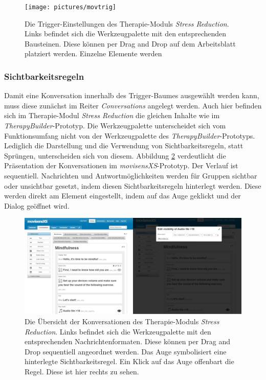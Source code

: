 \begin{figure}[h]
\centering
\texttt{[image: pictures/movtrig]}
\caption{Die Trigger-Einstellungen des Therapie-Moduls \emph{Stress Reduction}. Links befindet sich die Werkzeugpalette mit den entsprechenden Bausteinen. Diese können per Drag and Drop auf dem Arbeitsblatt platziert werden. Einzelne Elemente werden}
\label{start}
\end{figure}



\subsubsection{Sichtbarkeitsregeln}
Damit eine Konversation innerhalb des Trigger-Baumes ausgewählt werden kann, muss diese zunächst im Reiter \emph{Conversations} angelegt werden. Auch hier befinden sich im Therapie-Modul \emph{Stress Reduction} die gleichen Inhalte wie im \emph{TherapyBuilder}-Prototyp. Die Werkzeugpalette unterscheidet sich vom Funktionsumfang nicht von der Werkzeugpalette des \emph{TherapyBuilder}-Prototyps. Lediglich die Darstellung und die Verwendung von Sichtbarkeitsregeln, statt Sprüngen, unterscheiden sich von diesem. Abbildung \ref{movconv} verdeutlicht die Präsentation der Konversationen im \emph{movisensXS}-Prototyp. Der Verlauf ist sequentiell. Nachrichten und Antwortmöglichkeiten werden für Gruppen sichtbar oder unsichtbar gesetzt, indem diesen Sichtbarkeitsregeln hinterlegt werden. Diese werden direkt am Element eingestellt, indem auf das Auge geklickt und der Dialog geöffnet wird.

\begin{figure}[h]
\centering
\includegraphics[width=1\textwidth]{pictures/movconv}
\caption{Die Übersicht der Konversationen des Therapie-Moduls \emph{Stress Reduction}. Links befindet sich die Werkzeugpalette mit den entsprechenden Nachrichtenformaten. Diese können per Drag and Drop sequentiell angeordnet werden. Das Auge symbolisiert eine hinterlegte Sichtbarkeitsregel. Ein Klick auf das Auge offenbart die Regel. Diese ist hier rechts zu sehen.}
\label{movconv}
\end{figure}
